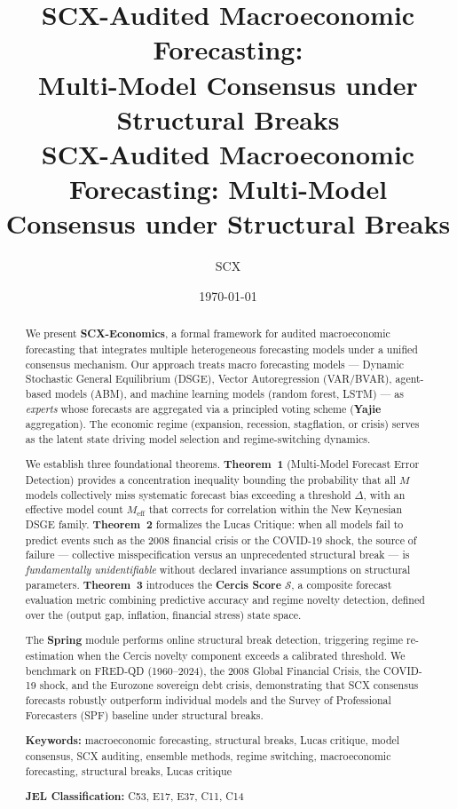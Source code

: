 \documentclass[12pt,a4paper]{article}
\title{\bfseries SCX-Audited Macroeconomic Forecasting:\\
Multi-Model Consensus under Structural Breaks\\
\large SCX-Audited Macroeconomic Forecasting: Multi-Model Consensus under Structural Breaks}
\author{SCX}
\date{\today}
\begin{document}
\maketitle

\begin{abstract}
We present \textbf{SCX-Economics}, a formal framework for audited macroeconomic
forecasting that integrates multiple heterogeneous forecasting models under
a unified consensus mechanism.  Our approach treats macro forecasting models
--- Dynamic Stochastic General Equilibrium (DSGE), Vector Autoregression
(VAR/BVAR), agent-based models (ABM), and machine learning models (random
forest, LSTM) --- as \emph{experts} whose forecasts are aggregated via
a principled voting scheme (\textbf{Yajie} aggregation).  The economic
regime (expansion, recession, stagflation, or crisis) serves as the latent
state driving model selection and regime-switching dynamics.

We establish three foundational theorems.  \textbf{Theorem~1} (Multi-Model
Forecast Error Detection) provides a concentration inequality bounding the
probability that all $M$ models collectively miss systematic forecast bias
exceeding a threshold $\Delta$, with an effective model count $M_{\text{eff}}$
that corrects for correlation within the New Keynesian DSGE family.
\textbf{Theorem~2} formalizes the Lucas Critique: when all models fail to
predict events such as the 2008 financial crisis or the COVID-19 shock, the
source of failure --- collective misspecification versus an unprecedented
structural break --- is \emph{fundamentally unidentifiable} without declared
invariance assumptions on structural parameters.  \textbf{Theorem~3}
introduces the \textbf{Cercis Score} $\mathcal{S}$, a composite forecast
evaluation metric combining predictive accuracy and regime novelty detection,
defined over the (output gap, inflation, financial stress) state space.

The \textbf{Spring} module performs online structural break detection,
triggering regime re-estimation when the Cercis novelty component exceeds
a calibrated threshold.  We benchmark on FRED-QD (1960--2024), the 2008
Global Financial Crisis, the COVID-19 shock, and the Eurozone sovereign
debt crisis, demonstrating that SCX consensus forecasts robustly outperform
individual models and the Survey of Professional Forecasters (SPF) baseline
under structural breaks.

\vspace{4pt}
\noindent\textbf{Keywords:} macroeconomic forecasting, structural breaks,
Lucas critique, model consensus, SCX auditing, ensemble methods, regime
switching, macroeconomic forecasting, structural breaks, Lucas critique

\noindent\textbf{JEL Classification:} C53, E17, E37, C11, C14
\end{abstract}
\end{document}

